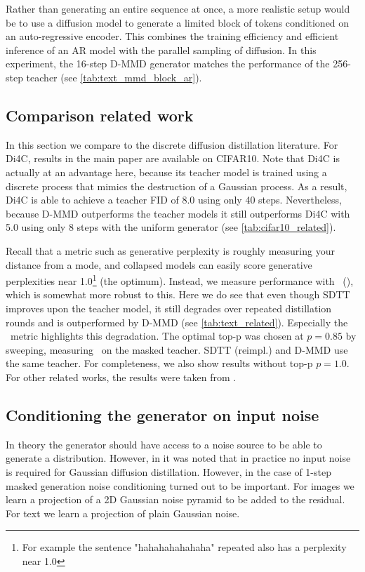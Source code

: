 Rather than generating an entire sequence at once, a more realistic setup would be to use a diffusion model to generate a limited block of tokens conditioned on an auto-regressive encoder. This combines the training efficiency and efficient inference of an AR model with the parallel sampling of diffusion. In this experiment, the 16-step D-MMD generator matches the performance of the 256-step teacher (see \autoref{tab:text_mmd_block_ar}).



\subsection{Comparison related work}
In this section we compare to the discrete diffusion distillation literature. For Di4C, results in the main paper are available on CIFAR10. Note that Di4C is actually at an advantage here, because its teacher model is trained using a discrete process that mimics the destruction of a Gaussian process. As a result, Di4C is able to achieve a teacher FID of 8.0 using only 40 steps. Nevertheless, because D-MMD outperforms the teacher models it still outperforms Di4C with 5.0 using only 8 steps with the uniform generator (see \autoref{tab:cifar10_related}).

Recall that a metric such as generative perplexity is roughly measuring your distance from a mode, and collapsed models can easily score generative perplexities near 1.0\footnote{For example the sentence "hahahahahahaha" repeated also has a perplexity near 1.0} (the optimum). Instead, we measure performance with \ggefull~(\gge), which is somewhat more robust to this. Here we do see that even though SDTT improves upon the teacher model, it still degrades over repeated distillation rounds and is outperformed by D-MMD (see \autoref{tab:text_related}). Especially the \gge~metric highlights this degradation. The optimal top-p was chosen at $p=0.85$ by sweeping, measuring \gge~on the masked teacher. SDTT (reimpl.) and D-MMD use the same teacher. For completeness, we also show results without top-p $p = 1.0$. For other related works, \citep{sahoo2025diffusion,roos2026categorical} the results were taken from \citep{lee2026one}.


\subsection{Conditioning the generator on input noise}
In theory the generator should have access to a noise source to be able to generate a distribution. However, in \citet{salimans2024multistep} it was noted that in practice no input noise is required for Gaussian diffusion distillation. However, in the case of 1-step masked generation \citep{zhu2025dimo} noise conditioning turned out to be important. For images we learn a projection of a 2D Gaussian noise pyramid to be added to the residual. For text we learn a projection of plain Gaussian noise.

